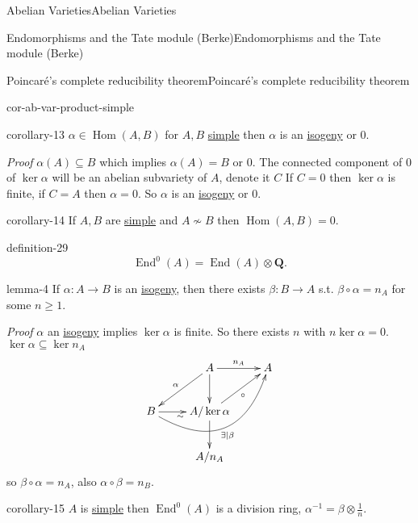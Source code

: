 \documentclass[10pt,]{book}
\makeatletter
\renewcommand*{\proofname}{Proof}
\renewenvironment{proof}[1][\proofname]{\par
  \pushQED{\qed}%
  \normalfont \topsep6\p@\@plus6\p@\relax
  \trivlist
  \item\relax
    {\itshape
    #1\@addpunct{.}}\hspace\labelsep\ignorespaces
}{%
  \popQED\endtrivlist\@endpefalse
}
\numberwithin{equation}{section}
\newcommand{\QQ}{\mathbf{Q}}
\DeclareMathOperator{\End}{End}
\DeclareMathOperator{\Hom}{Hom}
\makeatother
\begin{document}
\begin{chapterptx}{Abelian Varieties}{}{Abelian Varieties}{}{}
\begin{sectionptx}{Endomorphisms and the Tate module (Berke)}{}{Endomorphisms and the Tate module (Berke)}{}{}
\begin{subsectionptx}{Poincaré's complete reducibility theorem}{}{Poincaré's complete reducibility theorem}{}{}
\begin{corollary}{}{}{cor-ab-var-product-simple}
\end{corollary}
\begin{corollary}{}{}{corollary-13}%
\hypertarget{p-214}{}%
\(\alpha \in \Hom(A,B)\) for \(A,B\) \hyperref[def-simple-av]{simple} then \(\alpha\) is an \hyperref[def-supersing-isog-isog]{isogeny} or \(0\).%
\end{corollary}
\begin{proof}\hypertarget{proof-39}{}
\hypertarget{p-215}{}%
\(\alpha(A) \subseteq B\) which implies \(\alpha(A)  = B\) or \(0\). The connected component of 0 of \(\ker \alpha\) will be an abelian subvariety of \(A\), denote it \(C\) If \(C = 0\) then \(\ker \alpha\) is finite, if \(C = A\) then \(\alpha = 0\). So \(\alpha\) is an \hyperref[def-supersing-isog-isog]{isogeny} or \(0\).%
\end{proof}
\begin{corollary}{}{}{corollary-14}%
\hypertarget{p-216}{}%
If \(A,B\) are \hyperref[def-simple-av]{simple} and  \(A\not\sim B\) then \(\Hom(A,B) = 0\).%
\end{corollary}
\begin{definition}{}{definition-29}%
\hypertarget{p-217}{}%
%
\begin{equation*}
\End^0(A) = \End(A) \otimes \QQ\text{.}
\end{equation*}
%
\end{definition}
\begin{lemma}{}{}{lemma-4}%
\hypertarget{p-218}{}%
If \(\alpha \colon A\to B\) is an \hyperref[def-supersing-isog-isog]{isogeny}, then there exists \(\beta \colon B\to A\) s.t. \(\beta \circ \alpha = n_A\) for some \(n \ge 1\).%
\end{lemma}
\begin{proof}\hypertarget{proof-40}{}
\hypertarget{p-219}{}%
\(\alpha\) an \hyperref[def-supersing-isog-isog]{isogeny} implies \(\ker \alpha\) is finite. So there exists \(n\) with \(n \ker \alpha = 0\). \(\ker\alpha \subseteq \ker n_A\)%
\begin{equation*}
\xymatrix{
& A \ar[dl]_\alpha \ar[d]\ar[r]^{n_A} & A \\
B\ar[r]_\sim \ar@/_3.0pc/[urr]_{\exists | \beta} & A/\ker\alpha \ar[d]\ar[ur]_{\circ} &\\
& A/n_A &
}
\end{equation*}
so \(\beta\circ \alpha = n_A\), also \(\alpha \circ \beta = n_B\).%
\end{proof}
\begin{corollary}{}{}{corollary-15}%
\hypertarget{p-220}{}%
\(A\) is \hyperref[def-simple-av]{simple} then \(\End^0(A)\) is a division ring, \(\alpha^{-1} = \beta \otimes \frac 1n\).%

\end{corollary}
\end{subsectionptx}
\end{sectionptx}
\end{chapterptx}
\end{document}
